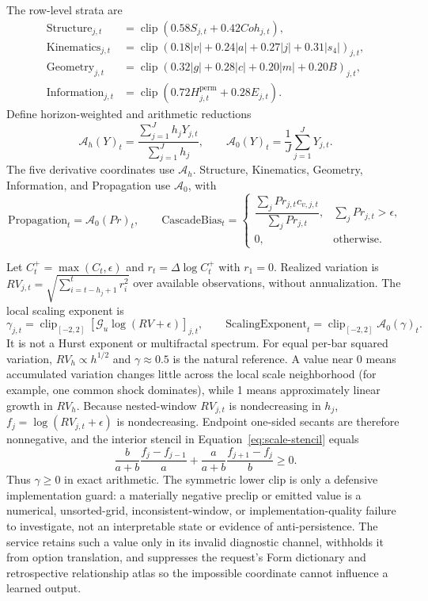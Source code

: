 \documentclass{article}
\newcommand{\clip}{\operatorname{clip}}
\begin{document}
The row-level strata are
\begin{align}
\mathrm{Structure}_{j,t}&=\clip(0.58S_{j,t}+0.42Coh_{j,t}),\\
\mathrm{Kinematics}_{j,t}&=\clip(0.18|v|+0.24|a|+0.27|j|+0.31|s_4|)_{j,t},\\
\mathrm{Geometry}_{j,t}&=\clip(0.32|g|+0.28|c|+0.20|m|+0.20B)_{j,t},\\
\mathrm{Information}_{j,t}&=\clip(0.72H^{\mathrm{perm}}_{j,t}+0.28E_{j,t}).
\end{align}
Define horizon-weighted and arithmetic reductions
\begin{equation}
\mathcal A_h(Y)_t=\frac{\sum_{j=1}^Jh_jY_{j,t}}{\sum_{j=1}^Jh_j},
\qquad
\mathcal A_0(Y)_t=\frac1J\sum_{j=1}^JY_{j,t}.
\label{eq:reductions}
\end{equation}
The five derivative coordinates use $\mathcal A_h$. Structure, Kinematics, Geometry, Information, and Propagation use $\mathcal A_0$, with
\begin{equation}
\mathrm{Propagation}_t=\mathcal A_0(Pr)_t,\qquad
\mathrm{CascadeBias}_t=
\begin{cases}
\dfrac{\sum_jPr_{j,t}c_{v,j,t}}{\sum_jPr_{j,t}},&\sum_jPr_{j,t}>\epsilon,\\
0,&\text{otherwise}.
\end{cases}
\end{equation}

Let $C_t^+=\max(C_t,\epsilon)$ and $r_t=\Delta\log C_t^+$ with $r_1=0$. Realized variation is
$RV_{j,t}=\sqrt{\sum_{i=t-h_j+1}^t r_i^2}$ over available observations, without annualization. The local scaling exponent is
\begin{equation}
\gamma_{j,t}=\clip_{[-2,2]}\left[\mathcal G_u\log(RV+\epsilon)\right]_{j,t},
\qquad \mathrm{ScalingExponent}_t=\clip_{[-2,2]}\mathcal A_0(\gamma)_t.
\end{equation}
It is not a Hurst exponent or multifractal spectrum. For equal per-bar squared variation, $RV_h\propto h^{1/2}$ and $\gamma\approx0.5$ is the natural reference. A value near 0 means accumulated variation changes little across the local scale neighborhood (for example, one common shock dominates), while 1 means approximately linear growth in $RV_h$. Because nested-window $RV_{j,t}$ is nondecreasing in $h_j$, $f_j=\log(RV_{j,t}+\epsilon)$ is nondecreasing. Endpoint one-sided secants are therefore nonnegative, and the interior stencil in Equation~\ref{eq:scale-stencil} equals
\begin{equation}
\frac{b}{a+b}\frac{f_j-f_{j-1}}{a}+\frac{a}{a+b}\frac{f_{j+1}-f_j}{b}\ge0.
\end{equation}
Thus $\gamma\ge0$ in exact arithmetic. The symmetric lower clip is only a defensive implementation guard: a materially negative preclip or emitted value is a numerical, unsorted-grid, inconsistent-window, or implementation-quality failure to investigate, not an interpretable state or evidence of anti-persistence. The service retains such a value only in its invalid diagnostic channel, withholds it from option translation, and suppresses the request's Form dictionary and retrospective relationship atlas so the impossible coordinate cannot influence a learned output.
\end{document}
